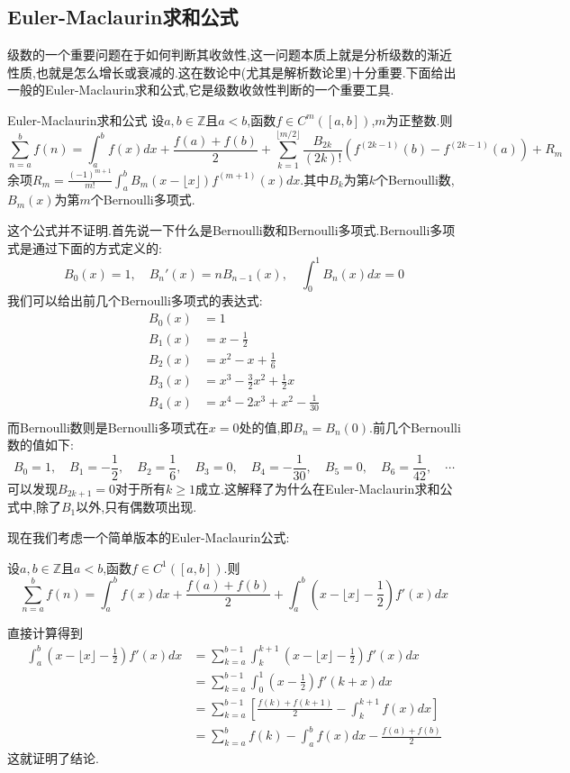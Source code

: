 \documentclass[a4paper,UTF8,12pt]{ctexart}
\begin{document}
\subsection{Euler-Maclaurin求和公式}
级数的一个重要问题在于如何判断其收敛性,这一问题本质上就是分析级数的渐近性质,也就是怎么增长或衰减的.这在数论中(尤其是解析数论里)十分重要\cite{apostol1998introduction}.下面给出一般的Euler-Maclaurin求和公式\cite{enwiki:1351518612},它是级数收敛性判断的一个重要工具.
\begin{Theorem}{Euler-Maclaurin求和公式}
设$a,b\in\mathbb{Z}$且$a<b$,函数$f\in C^{m}([a,b])$,$m$为正整数.则
$$
\sum_{n=a}^{b}f(n)=\int_{a}^{b}f(x)dx+\frac{f(a)+f(b)}{2}+\sum_{k=1}^{\lfloor m/2\rfloor }\frac{B_{2k}}{(2k)!}(f^{(2k-1)}(b)-f^{(2k-1)}(a))+R_m
$$
余项$R_m=\frac{(-1)^{m+1}}{m!}\int_{a}^{b}B_{m}(x-\lfloor x \rfloor)f^{(m+1)}(x)dx$.其中$B_{k}$为第$k$个Bernoulli数,$B_{m}(x)$为第$m$个Bernoulli多项式.
\end{Theorem}
这个公式并不证明.首先说一下什么是Bernoulli数和Bernoulli多项式.Bernoulli多项式是通过下面的方式定义的:
$$
B_0(x)=1, \quad B_n'(x)=nB_{n-1}(x), \quad \int_0^1 B_n(x) dx=0
$$
我们可以给出前几个Bernoulli多项式的表达式:
$$
\begin{aligned}
B_0(x) &= 1 \\
B_1(x) &= x - \frac{1}{2} \\
B_2(x) &= x^2 - x + \frac{1}{6} \\
B_3(x) &= x^3 - \frac{3}{2}x^2 + \frac{1}{2}x \\
B_4(x) &= x^4 - 2x^3 + x^2 - \frac{1}{30} \\
\end{aligned}
$$
而Bernoulli数则是Bernoulli多项式在$x=0$处的值,即$B_n = B_n(0)$.前几个Bernoulli数的值如下:
$$
B_0=1, \quad B_1=-\frac{1}{2}, \quad B_2=\frac{1}{6}, \quad B_3=0, \quad B_4=-\frac{1}{30}, \quad B_5=0, \quad B_6=\frac{1}{42}, \quad \cdots
$$
可以发现$B_{2k+1}=0$对于所有$k\geq 1$成立.这解释了为什么在Euler-Maclaurin求和公式中,除了$B_1$以外,只有偶数项出现.\par
现在我们考虑一个简单版本的Euler-Maclaurin公式:
\begin{Theorem}{}
设$a,b\in\mathbb{Z}$且$a<b$,函数$f\in C^{1}([a,b])$.则
$$
\sum_{n=a}^{b}f(n)=\int_{a}^{b}f(x)dx+\frac{f(a)+f(b)}{2}+\int_{a}^{b}(x-\lfloor x \rfloor-\frac{1}{2})f'(x)dx
$$
\end{Theorem}
\begin{Proof}
    直接计算得到
    $$
    \begin{aligned}
        \int_{a}^{b}(x-\lfloor x \rfloor-\frac{1}{2})f'(x)dx &= \sum_{k=a}^{b-1}\int_{k}^{k+1}(x-\lfloor x \rfloor-\frac{1}{2})f'(x)dx \\
            &= \sum_{k=a}^{b-1}\int_{0}^{1}(x-\frac{1}{2})f'(k+x)dx \\
            &= \sum_{k=a}^{b-1}\left[\frac{f(k)+f(k+1)}{2}-\int_{k}^{k+1}f(x)dx\right] \\
            &= \sum_{k=a}^{b}f(k)-\int_{a}^{b}f(x)dx-\frac{f(a)+f(b)}{2}
    \end{aligned}
    $$
    这就证明了结论.
\end{Proof}
\end{document}
